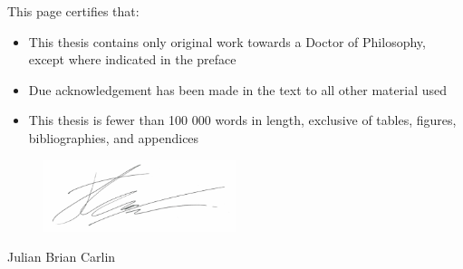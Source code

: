 This page certifies that:
\begin{itemize}
\item This thesis contains only original work towards a Doctor of Philosophy, except where indicated in the preface
\item Due acknowledgement has been made in the text to all other material used
\item This thesis is fewer than 100 000 words in length, exclusive of tables, figures, bibliographies, and appendices
\end{itemize}

\vspace{3cm}

\begin{figure}[h!]
  \raggedleft
  \includegraphics[width=0.5\textwidth]{figures/signature.png}
\end{figure}
\begin{flushright}
Julian Brian Carlin
\end{flushright}

